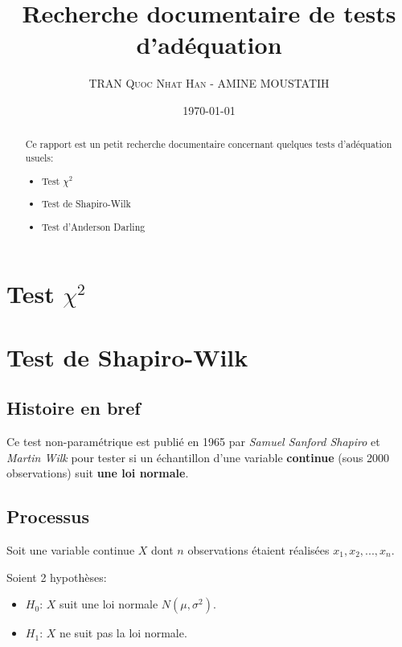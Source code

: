 \documentclass[12pt,a4paper]{article}
\author{\textsc{TRAN Quoc Nhat Han} - \textsc{AMINE MOUSTATIH}}
\title{Recherche documentaire de tests d'adéquation}
\date{\today}
\begin{document}
\maketitle 
\renewcommand{\contentsname}{Sommaire}
\tableofcontents

\clearpage

\begin{abstract}
Ce rapport est un petit recherche documentaire concernant quelques tests d'adéquation usuels:
\begin{itemize}
\item Test $\chi^2$
\item Test de Shapiro-Wilk
\item Test d'Anderson Darling
\end{itemize}
\end{abstract}

\clearpage

\section{Test $\chi^2$}

\section{Test de Shapiro-Wilk}

\subsection{Histoire en bref}
Ce test non-paramétrique est publié en 1965 par \emph{Samuel Sanford Shapiro} et \emph{Martin Wilk} pour tester si un échantillon d'une variable \textbf{continue} (sous 2000 observations) suit \textbf{une loi normale}.

\subsection{Processus}

Soit une variable continue $X$ dont $n$ observations étaient réalisées $x_1, x_2, ..., x_n$.

Soient 2 hypothèses: 
\begin{itemize}
\item $H_0$: $X$ suit une loi normale $N(\mu, \sigma^2)$.
\item $H_1$: $X$ ne suit pas la loi normale.
\end{itemize}
\end{document}
